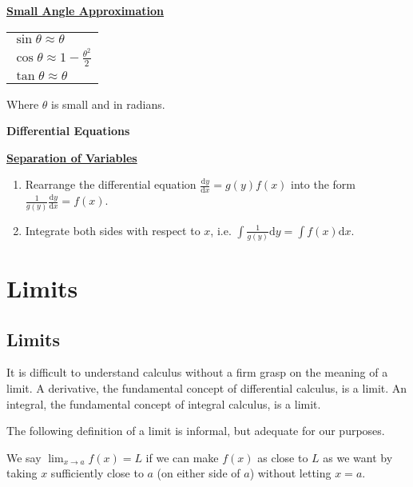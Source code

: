 \documentclass[11pt,a4paper]{book}
\begin{document}
\begin{sidewaysfigure}
\begin{minipage}[t]{0.4\textwidth}
\vspace{0.5cm}

\textbf{\large{}\uline{Small Angle Approximation
}}{\large\par}
\begin{tabular}[b]{>{\raggedright}m{4cm}}
$\sin\theta\approx\theta$
\tabularnewline
${\displaystyle \cos\theta\approx1-\frac{\theta^{2}}{2}}$
\tabularnewline
$\tan\theta\approx\theta$
\tabularnewline
\end{tabular}Where $\theta$ is small and in radians.

\begin{center}
\textbf{\Large{}Differential Equations}{\Large\par}
\par\end{center}
\textbf{\large{}\uline{Separation of Variables
}}{\large\par}
\begin{enumerate}
\item Rearrange the differential equation ${\displaystyle \frac{\mathrm{d}y}{\mathrm{d}x}=g\left(y\right)f\left(x\right)}$
into the form ${\displaystyle \frac{1}{g\left(y\right)}\frac{\mathrm{d}y}{\mathrm{d}x}=f\left(x\right)}$.
\item Integrate both sides with respect to $x$, i.e. ${\displaystyle \int}{\displaystyle \frac{1}{g\left(y\right)}\mathrm{d}y=\int f\left(x\right)\mathrm{d}x}$.
\end{enumerate}
\end{minipage}


\end{sidewaysfigure}

\newpage

\setcounter{chapter}{5}
\chapter{Limits}
\section{Limits}

It is difficult to understand calculus without a firm grasp on the
meaning of a limit. A derivative, the fundamental concept of differential
calculus, is a limit. An integral, the fundamental concept of integral
calculus, is a limit.

The following definition of a limit is informal, but adequate for
our purposes.

\begin{tcolorbox}[colback=blue!5, colframe=black, boxrule=.4pt, sharpish corners]

We say ${\displaystyle \lim_{x\rightarrow a}f\left(x\right)=L}$ if
we can make $f\left(x\right)$ as close to $L$ as we want by taking
$x$ sufficiently close to $a$ (on either side of $a$) without letting
$x=a$.
\end{tcolorbox}
\end{document}
